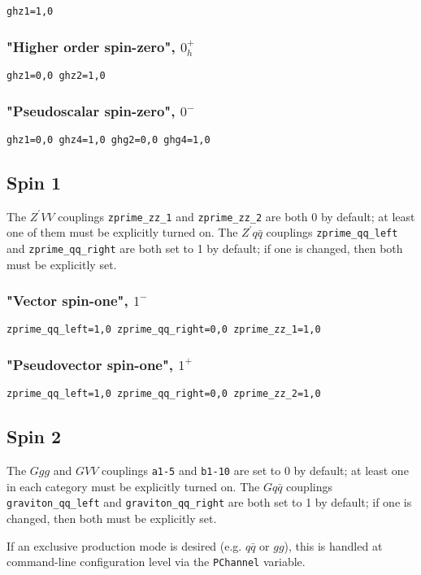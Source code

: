 \documentclass[aps,superscriptaddress,nofootinbib]{revtex4}
\begin{document}
\verb|ghz1=1,0|

\subsubsection{"Higher order spin-zero", $0_h^+$}

\verb|ghz1=0,0 ghz2=1,0|

\subsubsection{"Pseudoscalar spin-zero", $0^-$}

\verb|ghz1=0,0 ghz4=1,0 ghg2=0,0 ghg4=1,0|

\subsection{Spin 1}
The $Z^\prime VV$ couplings \verb|zprime_zz_1| and \verb|zprime_zz_2| are both 0 by default; at least one of them must be explicitly turned on.  The $Z^{\prime}q\bar{q}$ couplings \verb|zprime_qq_left| and \verb|zprime_qq_right| are both set to 1 by default; if one is changed, then both must be explicitly set.

\subsubsection{"Vector spin-one", $1^-$}

\verb|zprime_qq_left=1,0 zprime_qq_right=0,0 zprime_zz_1=1,0|

\subsubsection{"Pseudovector spin-one", $1^+$}

\verb|zprime_qq_left=1,0 zprime_qq_right=0,0 zprime_zz_2=1,0|

\subsection{Spin 2}
The $Ggg$ and $GVV$ couplings \verb|a1-5| and \verb|b1-10| are set to 0 by default; at least one in each category must be explicitly turned on.  The $Gq\bar{q}$ couplings \verb|graviton_qq_left| and \verb|graviton_qq_right| are both set to 1 by default; if one is changed, then both must be explicitly set.

If an exclusive production mode is desired (e.g. $q\bar{q}$ or $gg$), this is handled at command-line configuration level via the \verb|PChannel| variable.
\end{document}
